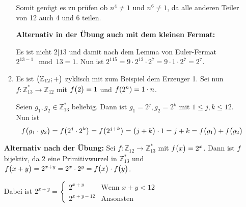 \documentclass{scrreprt}
\begin{document}
\begin{enumerate}[(a)]
\begin{enumerate}[(1)]
    Somit genügt es zu prüfen ob $n^4 \ne 1$ und $n^6 \ne 1$, da alle anderen
    Teiler von 12 auch 4 und 6 teilen.

    \textbf{Alternativ in der Übung auch mit dem kleinen Fermat:}

    Es ist nicht $2|13$ und damit nach dem Lemma von Euler-Fermat
    $2^{13 - 1} \mod 13 = 1$.
    Nun ist $2^{115} = 9 \cdot 2^{12} \cdot 2^7 = 9 \cdot 1 \cdot 2^7 = 2^7$.

  \item Es ist $\qty\big(\mathbb{Z}_{12}; +)$ zyklisch mit zum Beispiel dem
    Erzeuger 1.
    Sei nun $f \colon \mathbb{Z}_{13}^* \to \mathbb{Z}_{12}$ mit
    $f\qty\big(2) = 1$ und $f\qty(2^n) = 1 \cdot n$.

    Seien $g_1, g_2 \in \mathbb{Z}_{13}^*$ beliebig.
    Dann ist $g_1 = 2^j, g_2 = 2^k$ mit $1 \leq j,k \leq 12$.
    Nun ist
    \[
      f\qty\big(g_1 \cdot g_2) = f\qty(2^j \cdot 2^k) = f\qty(2^{j + k})
      = \qty\big(j + k) \cdot 1 = j + k = f\qty\big(g_1) + f\qty\big(g_2)
    \]
  \end{enumerate}

  \textbf{Alternativ nach der Übung:}
  Sei $f \colon \mathbb{Z}_{12} \to \mathbb{Z}_{13}^*$ mit $f\qty\big(x) = 2^x$.
  Dann ist $f$ bijektiv, da 2 eine Primitivwurzel in $\mathbb{Z}_{13}^*$ und
  $f\qty\big(x + y) = 2^{x + y} = 2^x \cdot 2^y = f\qty\big(x) \cdot f\qty\big(y)$.

  Dabei ist $2^{x + y} = \begin{cases}
    2^{x + y} & \text{Wenn } x+ y < 12 \\
    2^{x + y - 12} & \text{Ansonsten}
  \end{cases}$
\end{enumerate}

\newpage
\end{document}
